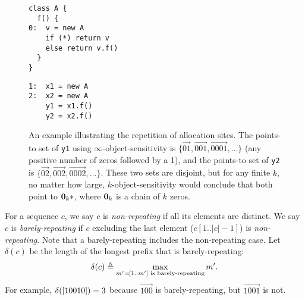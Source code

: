 \begin{figure}
\begin{center}
\begin{minipage}{2in}
\begin{verbatim}
class A {
  f() {
0:  v = new A
    if (*) return v
    else return v.f()
  }
}
\end{verbatim}
\end{minipage}
\begin{minipage}{1in}
\begin{verbatim}
1:  x1 = new A
2:  x2 = new A
    y1 = x1.f()
    y2 = x2.f()
\end{verbatim}
\end{minipage}
\end{center}
\caption{\label{fig:recursion} An example illustrating the repetition of allocation sites.
The points-to set of {\tt y1} using $\infty$-object-sensitivity
is $\{\vec{01},\vec{001},\vec{0001},\dots\}$ (any positive number of zeros followed by a 1),
and the points-to set of {\tt y2} is $\{\vec{02},\vec{002},\vec{0002},\dots\}$.
These two sets are disjoint, but for any finite $k$, no matter how large,
$k$-object-sensitivity would conclude that both point to $\mathbf{0}_k*$, where $\mathbf{0}_k$ is a chain of $k$ zeros.
}
\end{figure}

For a sequence $c$, we say $c$ is {\em non-repeating} if all its elements are distinct.
We say $c$ is {\em barely-repeating} if $c$ excluding the last element ($c[1..|c|-1]$)
is {\em non-repeating}.  Note that a barely-repeating includes the non-repeating case.
Let $\delta(c)$ be the length of the longest prefix that is barely-repeating:
\begin{align}
\label{eqn:barelyLen}
\delta(c) \triangleq \max_{m' : c[1..m'] \text{ is barely-repeating}} m'.
\end{align}
For example, $\delta([10010]) = 3$ because $\vec{100}$ is barely-repeating, but $\vec{1001}$ is not.

